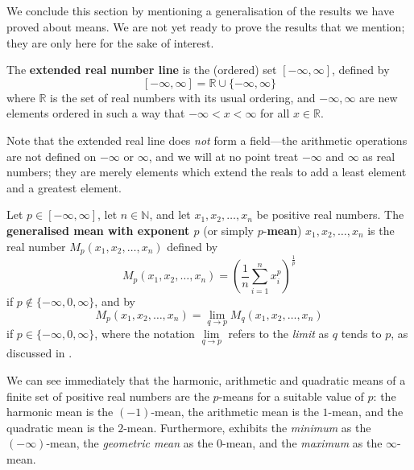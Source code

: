 \subsection*{}

We conclude this section by mentioning a generalisation of the results we have proved about means. We are not yet ready to prove the results that we mention; they are only here for the sake of interest.

\begin{definition}
\label{defExtendedRealLine}
The \textbf{extended real number line} is the (ordered) set $[-\infty, \infty]$, defined by
\[ [-\infty,\infty] = \mathbb{R} \cup \{ -\infty, \infty \} \]
where $\mathbb{R}$ is the set of real numbers with its usual ordering, and $-\infty,\infty$ are new elements ordered in such a way that $-\infty < x < \infty$ for all $x \in \mathbb{R}$.
\end{definition}

Note that the extended real line does \textit{not} form a field---the arithmetic operations are not defined on $-\infty$ or $\infty$, and we will at no point treat $-\infty$ and $\infty$ as real numbers; they are merely elements which extend the reals to add a least element and a greatest element.

\begin{definition}
\label{defGeneralisedMean}
Let $p \in [-\infty,\infty]$, let $n \in \mathbb{N}$, and let $x_1,x_2,\dots,x_n$ be positive real numbers. The \textbf{generalised mean with exponent $p$} (or simply $p$-\textbf{mean}) $x_1,x_2,\dots,x_n$ is the real number $M_p(x_1,x_2,\dots,x_n)$ defined by
\[ M_p(x_1,x_2,\dots,x_n) = \left( \frac{1}{n} \sum_{i=1}^n x_i^p \right)^{\frac{1}{p}} \]
if $p \not \in \{ -\infty, 0, \infty \}$, and by
\[ M_p(x_1,x_2,\dots,x_n) = \lim_{q \to p} M_q(x_1,x_2,\dots,x_n) \]
if $p \in \{ -\infty, 0, \infty \}$, where the notation $\lim\limits_{q \to p}$ refers to the \textit{limit} as $q$ tends to $p$, as discussed in .
\end{definition}

We can see immediately that the harmonic, arithmetic and quadratic means of a finite set of positive real numbers are the $p$-means for a suitable value of $p$: the harmonic mean is the $(-1)$-mean, the arithmetic mean is the $1$-mean, and the quadratic mean is the $2$-mean. Furthermore,  exhibits the \textit{minimum} as the $(-\infty)$-mean, the \textit{geometric mean} as the $0$-mean, and the \textit{maximum} as the $\infty$-mean.

